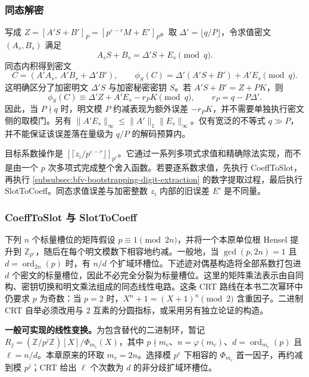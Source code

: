 \subsubsection{同态解密}
\label{subsubsec:bfv-bootstrapping-homomorphic-decryption}

写成 $Z=[A'S+B']_P=[p^{\varepsilon-r}M+E']_P$。取 $\Delta'=\lfloor q/P\rfloor$，令求值密文 $(A_s,B_s)$ 满足
\[
A_sS+B_s=\Delta'S+E_s\pmod q.
\]
同态内积得到密文
\[
C=(A'A_s,\ A'B_s+\Delta'B'),
\qquad \phi_S(C)=\Delta'(A'S+B')+A'E_s\pmod q.
\]
这明确区分了加密明文 $\Delta'S$ 与加密秘密密钥 $S$。若 $A'S+B'=Z+PK$，则
\[
\phi_S(C)\equiv\Delta'Z+A'E_s-r_PK\pmod q,
\qquad r_P=q-P\Delta'.
\]
因此，当 $P\nmid q$ 时，明文模 $P$ 约减表现为额外误差 $-r_PK$，并不需要单独执行密文侧的取模门。另有 $\|A'E_s\|_\infty\leq\|A'\|_1\|E_s\|_\infty$。仅有宽泛的不等式 $q\gg P$，并不能保证该误差落在量级为 $q/P$ 的解码预算内。

目标系数操作是 $[\lceil z_i/p^{\varepsilon-r}\rfloor]_{p^r}$。它通过一系列多项式求值和精确除法实现，而不是由一个 $p$ 次多项式完成整个舍入函数。若要逐系数求值，先执行 \textsf{CoeffToSlot}，再执行 \autoref{subsubsec:bfv-bootstrapping-digit-extraction} 的数字提取过程，最后执行 \textsf{SlotToCoeff}。同态求值误差与加密整数 $z_i$ 内部的旧误差 $E'$ 是不同量。

\subsubsection{\textsf{CoeffToSlot} 与 \textsf{SlotToCoeff}}
\label{subsubsec:bfv-bootstrapping-coefftoslot}

下列 $n$ 个标量槽位的矩阵假设 $p\equiv1\pmod{2n}$，并将一个本原单位根 Hensel 提升到 $\mathbb Z_{p^\varepsilon}$，随后在每个明文模数下相容地约减。一般地，当 $\gcd(p,2n)=1$ 且 $d=\operatorname{ord}_{2n}(p)$ 时，有 $n/d$ 个扩域环槽位。下述迹对偶基构造将全部系数打包进 $d$ 个密文的标量槽位，因此不必完全分裂为标量槽位。这里的矩阵乘法表示由自同构、密钥切换和明文乘法组成的同态线性电路。这条 CRT 路线在本书二次幂环中仍要求 $p$ 为奇数：当 $p=2$ 时，$X^n+1=(X+1)^n\pmod2$ 含重因子。二进制 CRT 自举必须改用与 $2$ 互素的分圆指标，或采用另有独立论证的构造。

\textbf{一般可实现的线性变换。}为包含替代的二进制环，暂记 $R_j=(\mathbb Z/p^j\mathbb Z)[X]/\Phi_{m_c}(X)$，其中 $p\nmid m_c$、$n=\varphi(m_c)$、$d=\operatorname{ord}_{m_c}(p)$ 且 $\ell=n/d$。本章原来的环取 $m_c=2n$。选择模 $p^\varepsilon$ 下相容的 $\Phi_{m_c}$ 首一因子，再约减到模 $p^j$；CRT 给出 $\ell$ 个次数为 $d$ 的非分歧扩域环槽位。


